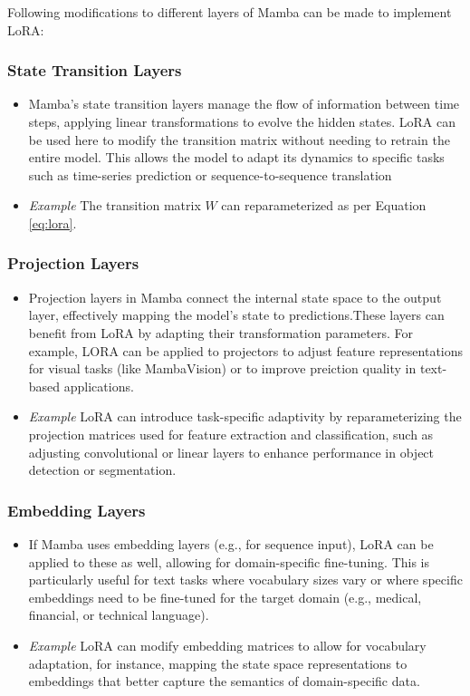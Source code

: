 \documentclass[12pt, conference, compsoc, onecolumn]{IEEEtran}
\begin{document}
	Following modifications to different layers of Mamba can be made to implement LoRA:
	
	\subsubsection*{State Transition Layers}
	\hfill
	\begin{itemize}
		\item Mamba’s state transition layers manage the flow of information between time steps, applying linear transformations to evolve the hidden states. LoRA can be used here to modify the transition matrix without needing to retrain the entire model. This allows the model to adapt its dynamics to specific tasks such as time-series prediction or sequence-to-sequence translation
		\item \textit{Example} The transition matrix $W$ can reparameterized as per Equation \ref{eq:lora}.
	\end{itemize}
	
	\subsubsection*{Projection Layers}
	\hfill
	\begin{itemize}
		\item Projection layers in Mamba connect the internal state space to the output layer, effectively mapping the model's state to predictions.These layers can benefit from LoRA by adapting their transformation parameters. For example, LORA can be applied to projectors to adjust feature representations for visual tasks (like MambaVision) or to improve preiction quality in text-based applications.
		
		\item \textit{Example} LoRA can introduce task-specific adaptivity by reparameterizing the projection matrices used for feature extraction and classification, such as adjusting convolutional or linear layers to enhance performance in object detection or segmentation.
	\end{itemize}
	
	\subsubsection*{Embedding Layers}
	\hfill
	\begin{itemize}
		\item If Mamba uses embedding layers (e.g., for sequence input), LoRA can be applied to these as well, allowing for domain-specific fine-tuning. This is particularly useful for text tasks where vocabulary sizes vary or where specific embeddings need to be fine-tuned for the target domain (e.g., medical, financial, or technical language).
		
		\item \textit{Example} LoRA can modify embedding matrices to allow for vocabulary adaptation, for instance, mapping the state space representations to embeddings that better capture the semantics of domain-specific data.
	\end{itemize}
	
\end{document}
